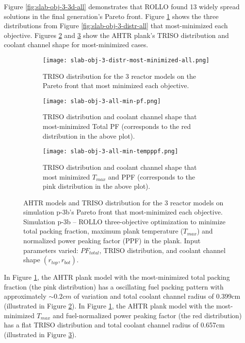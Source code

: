 Figure \ref{fig:slab-obj-3-3d-all} demonstrates that \gls{ROLLO} found 13 widely spread 
solutions in the final generation's Pareto front. 
Figure \ref{fig:slab-obj-3-distr-most-minimized-distr-all} shows the three distributions 
from Figure \ref{fig:slab-obj-3-distr-all} that most-minimized each objective. 
Figures \ref{fig:slab-obj-3-all-min-pf} and \ref{fig:slab-obj-3-all-min-tempppf} show 
the \gls{AHTR} plank's TRISO distribution and coolant channel shape for most-minimized 
cases. 
\begin{figure}[htbp!]
    \begin{subfigure}{\textwidth}
        \texttt{[image: slab-obj-3-distr-most-minimized-all.png]}
        \caption{TRISO distribution for the 3 reactor models on the Pareto 
        front that most minimized each objective.}
        \label{fig:slab-obj-3-distr-most-minimized-distr-all}
    \end{subfigure}
    \begin{subfigure}{\textwidth}
        \texttt{[image: slab-obj-3-all-min-pf.png]}
        \caption{TRISO distribution and coolant channel shape that most-minimized Total 
        PF (corresponds to the red distribution in the above plot).}
        \label{fig:slab-obj-3-all-min-pf}
    \end{subfigure}
    \begin{subfigure}{\textwidth}
        \texttt{[image: slab-obj-3-all-min-tempppf.png]}
        \caption{TRISO distribution and coolant channel shape that most minimized 
        $T_{max}$ and PPF (corresponds to the pink distribution in the above plot).}
        \label{fig:slab-obj-3-all-min-tempppf}
    \end{subfigure}
    \caption{AHTR models and TRISO distribution for the 3 reactor models on simulation 
    p-3b's Pareto front that most-minimized each objective.
    Simulation p-3b -- ROLLO three-objective optimization to minimize total 
    packing fraction, maximum plank temperature ($T_{max}$) and normalized power peaking 
    factor (PPF) in the plank. 
    Input parameters varied: $PF_{total}$, TRISO distribution, and coolant channel shape 
    $(r_{top}, r_{bot})$.}
    \label{fig:slab-obj-3-distr-most-minimized-all}
\end{figure}

In Figure \ref{fig:slab-obj-3-distr-most-minimized-distr-all}, the \gls{AHTR} plank model 
with the most-minimized total packing fraction (the pink distribution) has a oscillating fuel 
packing pattern with approximately $\sim0.2cm$ of variation and total coolant channel radius 
of 0.399cm (illustrated in Figure \ref{fig:slab-obj-3-all-min-pf}).
In Figure \ref{fig:slab-obj-3-distr-most-minimized-distr-all}, the \gls{AHTR} plank model with 
the most-minimized $T_{max}$ and fuel-normalized power peaking factor (the red distribution) 
has a flat TRISO distribution and total coolant channel radius of 0.657cm 
(illustrated in Figure \ref{fig:slab-obj-3-all-min-tempppf}). 

